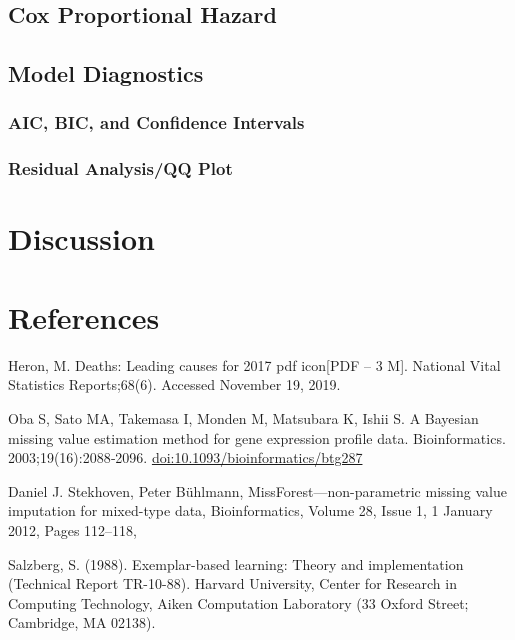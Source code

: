 \documentclass[
]{article}
\begin{document}
\hypertarget{cox-proportional-hazard}{%
\subsection{Cox Proportional Hazard}\label{cox-proportional-hazard}}

\hypertarget{model-diagnostics}{%
\subsection{Model Diagnostics}\label{model-diagnostics}}

\hypertarget{aic-bic-and-confidence-intervals}{%
\subsubsection{AIC, BIC, and Confidence
Intervals}\label{aic-bic-and-confidence-intervals}}

\hypertarget{residual-analysisqq-plot}{%
\subsubsection{Residual Analysis/QQ
Plot}\label{residual-analysisqq-plot}}

\hypertarget{discussion}{%
\section{Discussion}\label{discussion}}

\hypertarget{references}{%
\section{References}\label{references}}

Heron, M. Deaths: Leading causes for 2017 pdf icon{[}PDF -- 3 M{]}.
National Vital Statistics Reports;68(6). Accessed November 19, 2019.

Oba S, Sato MA, Takemasa I, Monden M, Matsubara K, Ishii S. A Bayesian
missing value estimation method for gene expression profile data.
Bioinformatics. 2003;19(16):2088‐2096.
\url{doi:10.1093/bioinformatics/btg287}

Daniel J. Stekhoven, Peter Bühlmann, MissForest---non-parametric missing
value imputation for mixed-type data, Bioinformatics, Volume 28, Issue
1, 1 January 2012, Pages 112--118,

Salzberg, S. (1988). Exemplar-based learning: Theory and implementation
(Technical Report TR-10-88). Harvard University, Center for Research in
Computing Technology, Aiken Computation Laboratory (33 Oxford Street;
Cambridge, MA 02138).
\end{document}
